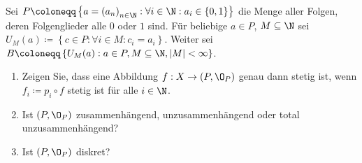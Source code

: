 \begin{assignment}
  Sei \( P \coloneqq \left \{ a = {(a_n)}_{n \in \N} : \forall i \in \N : a_i \in \left \{ 0,1 \right \} \right \} \) die Menge aller Folgen, deren Folgenglieder alle \( 0 \) oder \( 1 \) sind. Für beliebige \( a \in P \), \( M \subseteq \N \) sei \( U_M(a) \coloneqq \left \{ c \in P : \forall i \in M : c_i = a_i \right \} \). Weiter sei \( B \coloneqq \left \{ U_M(a) : a \in P, M \subseteq \N, \left \vert M \right \vert < \infty \right \} \).
  \begin{enumerate}[label= (\alph*)]
    \item Zeigen Sie, dass eine Abbildung \( f: X \to (P, \O_P) \) genau dann stetig ist, wenn \( f_i \coloneqq p_i \circ f \) stetig ist für alle \( i \in \N \).
    \item Ist \( (P, \O_P) \) zusammenhängend, unzusammenhängend oder total unzusammenhängend?
    \item Ist \( (P, \O_P) \) diskret?
  \end{enumerate}
\end{assignment}
